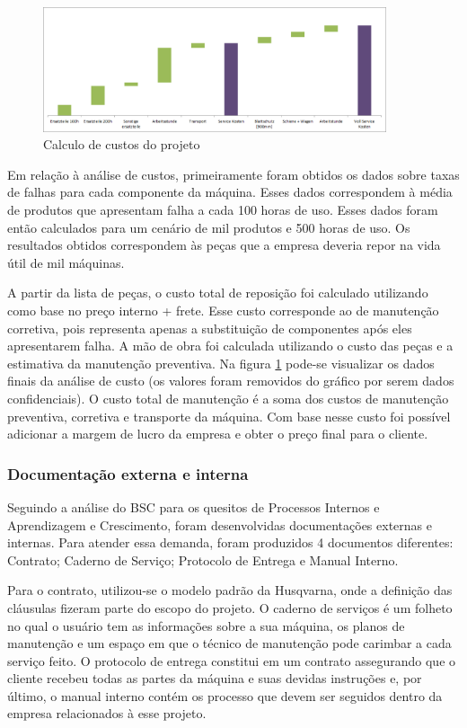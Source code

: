 \documentclass[12pt]{article}
\begin{document}
\begin{figure}[h!]
	\centering
	\includegraphics[width=0.9\textwidth]{img/ws220-waterfall.png}
	\caption{Calculo de custos do projeto}
	\label{fig:ws-waterfall}
\end{figure}

	Em relação à análise de custos, primeiramente foram obtidos os dados sobre taxas de falhas para cada componente da máquina. Esses dados correspondem à média de produtos que apresentam falha a cada 100 horas de uso. Esses dados foram então calculados para um cenário de mil produtos e 500 horas de uso. Os resultados obtidos correspondem às peças que a empresa deveria repor na vida útil de mil máquinas. 
	
	A partir da lista de peças, o custo total de reposição foi calculado utilizando como base no preço interno + frete. Esse custo corresponde ao de manutenção corretiva, pois representa apenas a substituição de componentes após eles apresentarem falha. A mão de obra foi calculada utilizando o custo das peças e a estimativa da manutenção preventiva. Na figura \ref{fig:ws-waterfall} pode-se visualizar os dados finais da análise de custo (os valores foram removidos do gráfico por serem dados confidenciais). O custo total de manutenção é a soma dos custos de manutenção preventiva, corretiva e transporte da máquina. Com base nesse custo foi possível adicionar a margem de lucro da empresa e obter o preço final para o cliente.
	
\subsubsection{Documentação externa e interna}

	Seguindo a análise do BSC para os quesitos de Processos Internos e Aprendizagem e Crescimento, foram desenvolvidas documentações externas e internas. Para atender essa demanda, foram produzidos 4 documentos diferentes: Contrato; Caderno de Serviço; Protocolo de Entrega e Manual Interno.

	Para o contrato, utilizou-se o modelo padrão da Husqvarna, onde a definição das cláusulas fizeram parte do escopo do projeto. O caderno de serviços é um folheto no qual o usuário tem as informações sobre a sua máquina, os planos de manutenção e um espaço em que o técnico de manutenção pode carimbar a cada serviço feito. O protocolo de entrega constitui em um contrato assegurando que o cliente recebeu todas as partes da máquina e suas devidas instruções e, por último, o manual interno contém os processo que devem ser seguidos dentro da empresa relacionados à esse projeto.
\end{document}
